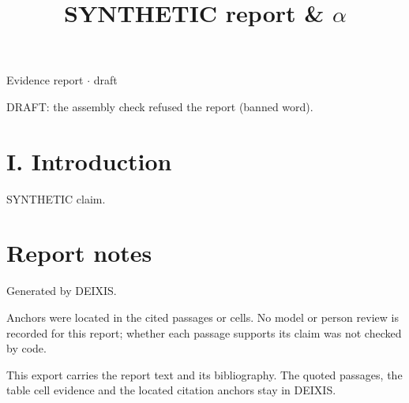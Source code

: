 \documentclass[journal]{IEEEtran}
\begin{document}
\title{SYNTHETIC report \& \ensuremath{\alpha}}

\maketitle

\noindent Evidence report \ensuremath{\cdot} draft

\noindent DRAFT: the assembly check refused the report (banned word).

\section*{I. Introduction}

SYNTHETIC claim. \cite{Synth26}

\section*{Report notes}

Generated by DEIXIS.

Anchors were located in the cited passages or cells. No model or person review is recorded for this report; whether each passage supports its claim was not checked by code.

This export carries the report text and its bibliography. The quoted passages, the table cell evidence and the located citation anchors stay in DEIXIS.




\end{document}
